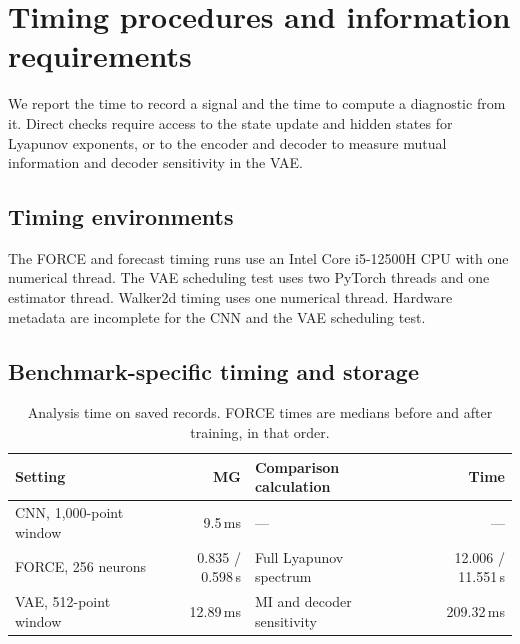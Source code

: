 {\section{Timing procedures and information requirements}\label{app:cost}
We report the time to record a signal and the time to compute a diagnostic from it. Direct checks require access to the state update and hidden states for Lyapunov exponents, or to the encoder and decoder to measure mutual information and decoder sensitivity in the VAE.


\subsection{Timing environments}\label{app:hardware}
The FORCE and forecast timing runs use an Intel Core i5-12500H CPU with one numerical thread. The VAE scheduling test uses two PyTorch threads and one estimator thread. Walker2d timing uses one numerical thread. Hardware metadata are incomplete for the CNN and the VAE scheduling test.



\subsection{Benchmark-specific timing and storage}

\begin{table}[htbp]
\centering\small
\caption{Analysis time on saved records. FORCE times are medians before and after training, in that order.}
\label{tab:cost}
\begin{tabular}{lrlr}
\toprule
Setting & MG & Comparison calculation & Time \\
\midrule
CNN, 1,000-point window & 9.5\,ms & --- & --- \\
FORCE, 256 neurons & 0.835 / 0.598\,s & Full Lyapunov spectrum & 12.006 / 11.551\,s \\
VAE, 512-point window & 12.89\,ms & MI and decoder sensitivity & 209.32\,ms \\
\bottomrule
\end{tabular}
\end{table}

}

